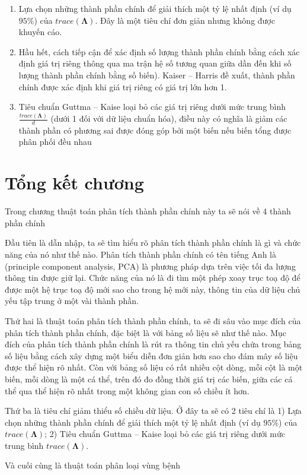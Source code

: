 \documentclass[../thesis.tex]{subfiles}
\begin{document}
\begin{enumerate}
	\item Lựa chọn những thành phần chính để giải thích một tỷ lệ nhất định (ví dụ $ 95\% $) của $ trace(\bm{\Lambda}) $. Đây là một tiêu chí đơn giản nhưng không được khuyến cáo.
	\item Hầu hết, cách tiếp cận để xác định số lượng thành phần chính bằng cách xác định giá trị riêng thông qua ma trận hệ số tương quan giữa dần đến khi số lượng thành phần chính bằng số biến). Kaiser -- Harris đề xuất, thành phần chính được xác định khi giá trị riêng có giá trị lớn hơn 1.
	\item Tiêu chuẩn Guttma -- Kaise loại bỏ các giá trị riêng dưới mức trung bình $ \tfrac{trace(\bm{\Lambda})}{d} $ (dưới 1 đối với dữ liệu chuẩn hóa), điều này có nghĩa là giảm các thành phần có phương sai được đóng góp bởi một biến nếu biến tổng được phân phối đều nhau
\end{enumerate}

\newpage
\section*{Tổng kết chương}


Trong chương thuật toán phân tích thành phần chính này ta sẽ nói về 4 thành phần chính

Đầu tiên là dẫn nhập, ta sẽ tìm hiểu rõ phân tích thành phần chính là gì và chức năng của nó như thế nào. Phân tích thành phần chính có tên tiếng Anh là (principle component analysis, PCA) là phương pháp dựa trên việc tối đa
lượng thông tin được giữ lại. Chức năng của nó là đi tìm một phép xoay trục toạ độ để được một hệ trục toạ độ mới sao cho trong hệ mới này, thông tin của dữ liệu chủ yếu tập trung ở một vài thành phần. 

Thứ hai là thuật toán phân tích thành phần chính, ta sẽ đi sâu vào mục đích của phân tích thành phần chính, đặc biệt là với bảng số liệu sẽ như thế nào. Mục đích của phân tích thành phần chính là rút ra thông tin chủ yếu chứa trong bảng số liệu bằng cách xây dựng một biểu diễn đơn giản hơn sao cho đám mây số liệu được thể hiện rõ nhất. Còn với bảng số liệu có rất nhiều cột dòng, mỗi cột là một biến, mỗi dòng là một cá thể, trên đó đo đồng thời giá trị các biến, giữa các cá thể qua thể hiện rõ nhất trong một không gian con số chiều ít hơn.

Thứ ba là tiêu chí giảm thiểu số chiều dữ liệu. Ở đây ta sẽ có 2 tiêu chí là 1) Lựa chọn những thành phần chính để giải thích một tỷ lệ nhất định (ví dụ $ 95\% $) của $ trace(\bm{\Lambda}) $; 2)  Tiêu chuẩn Guttma – Kaise loại bỏ các giá trị riêng dưới mức trung bình $ trace(\bm{\Lambda}) $.

Và cuối cùng là thuật toán phân loại vùng bệnh
\end{document}
